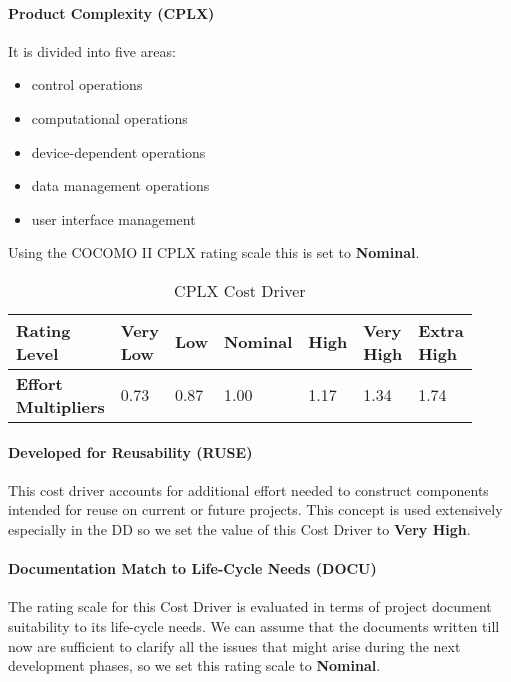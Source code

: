 \paragraph{Product Complexity (CPLX)} It is divided into five areas:
\begin{itemize}
	\item control operations
	\item computational operations
	\item device-dependent operations
	\item data management operations
	\item user interface management
\end{itemize}
Using the COCOMO II CPLX rating scale this is set to \textbf{Nominal}. 
\begin{table}[H]
	\centering
	\begin{tabular}{|M{0.165\linewidth}|M{0.125\linewidth}|M{0.125\linewidth}|M{0.125\linewidth}|M{0.125\linewidth}|M{0.125\linewidth}|M{0.125\linewidth}|}
		\hline
		\textbf{Rating Level} & Very Low & Low & Nominal & High & Very High & Extra High \\
		\hline
		\textbf{Effort Multipliers} & 0.73 & 0.87 & 1.00 & 1.17 & 1.34 & 1.74 \\
		\hline
	\end{tabular}
	\caption{CPLX Cost Driver}
\end{table}

\paragraph{Developed for Reusability (RUSE)} This cost driver accounts for additional effort needed to construct components intended for reuse on current or future projects. This concept is used extensively especially in the DD so we set the value of this Cost Driver to \textbf{Very High}.

\paragraph{Documentation Match to Life-Cycle Needs (DOCU)} The rating scale for this Cost Driver is evaluated in terms of project document suitability to its life-cycle needs. We can assume that the documents written till now are sufficient to clarify all the issues that might arise during the next development phases, so we set this rating scale to \textbf{Nominal}.

